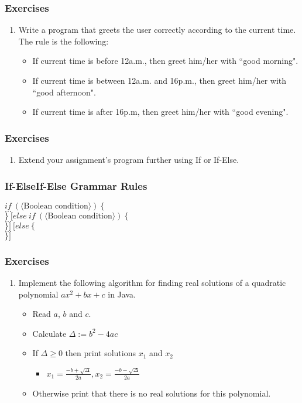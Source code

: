 \documentclass{beamer}
\newcommand{\cindent}{\hskip20pt}
\begin{document}
	\begin{frame}
		\frametitle{Exercises}
		\begin{enumerate}
			\item Write a program that greets the user correctly according to the current time. The rule is the following:
			\begin{itemize}
				\item If current time is before 12a.m., then greet him/her with ``good morning".
				\item If current time is between 12a.m. and 16p.m., then greet him/her with ``good afternoon".
				\item If current time is after 16p.m, then greet him/her with ``good evening".
			\end{itemize}
		\end{enumerate}
	\end{frame}

	\begin{frame}
		\frametitle{Exercises}
		\begin{enumerate}[2]
			\item Extend your assignment's program further using If or If-Else.
		\end{enumerate}
	\end{frame}

	\begin{frame}
		\frametitle{If-ElseIf-Else Grammar Rules}
		$if\ (\langle \text{Boolean condition} \rangle)\ \{$\\
		\cindent $...$\\
		$\}\ [else\ if\ (\langle \text{Boolean condition} \rangle) \ \{$\\
		\cindent $...$\\
		$\}]\ [else\ \{$\\
		\cindent $...$\\
		$\}]$\\
	\end{frame}

	\begin{frame}
		\frametitle{Exercises}
		\begin{enumerate}
			\item Implement the following algorithm for finding real solutions of a quadratic polynomial $ax^2 + bx + c$ in Java.
			\begin{itemize}
				\item Read $a$, $b$ and $c$.
				\item Calculate $\Delta := b^2 - 4ac$
				\item If $\Delta \ge 0$ then print solutions $x_1$ and $x_2$
				\begin{itemize}
					\item $x_1 = \frac{-b + \sqrt{\Delta}}{2a}, x_2 = \frac{-b - \sqrt{\Delta}}{2a}$
				\end{itemize}
				\item Otherwise print that there is no real solutions for this polynomial.
			\end{itemize}
		\end{enumerate}
	\end{frame}
\end{document}
